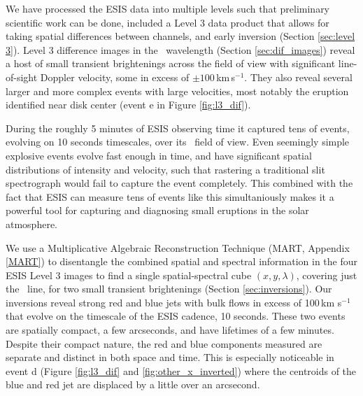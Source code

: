 	We have processed the  ESIS data into multiple levels such that preliminary scientific work can be done, included a Level 3 data product that allows for taking spatial differences between channels, and early inversion (Section \ref{sec:level 3}).
	Level 3 difference images in the \ov \ wavelength (Section \ref{sec:dif_images}) reveal a host of small transient brightenings across the field of view with significant line-of-sight Doppler velocity, some in excess of $\pm 100\,$km\,s$^{-1}$.
	They also reveal several larger and more complex events with large velocities, most notably the eruption identified near disk center (event e in Figure \ref{fig:l3_dif}).
	
    During the roughly 5 minutes of ESIS observing time it captured tens of events, evolving on 10 seconds timescales, over its \esisfov \ field of view.
	Even seemingly simple explosive events evolve fast enough in time, and have significant spatial distributions of intensity and velocity, such that rastering a traditional slit spectrograph would fail to capture the event completely. 
	This combined with the fact that ESIS can measure tens of events like this simultaniously makes it a powerful tool for capturing and diagnosing small eruptions in the solar atmosphere.
	
	We use a Multiplicative Algebraic Reconstruction Technique (MART, Appendix \ref{MART}) to disentangle the combined spatial and spectral information in the four ESIS Level 3 images to find a single spatial-spectral cube $(x,y,\lambda)$, covering just the \ov\ line, for two small transient brightenings (Section \ref{sec:inversions}).
	Our inversions reveal strong red and blue jets with bulk flows in excess of 100\,km s$^{-1}$ that evolve on the timescale of the ESIS cadence, 10 seconds.
	These two events are spatially compact, a few arcseconds, and have lifetimes of a few minutes.
	Despite their compact nature, the red and blue components measured are separate and distinct in both space and time. 
	This is especially noticeable in event d (Figure \ref{fig:l3_dif} and \ref{fig:other_x_inverted}) where the centroids of the blue and red jet are displaced by a little over an arcsecond. 
	
